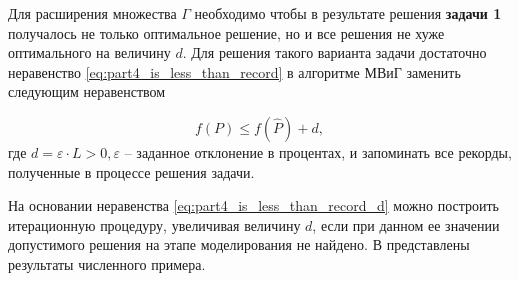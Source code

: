 Для расширения множества $\Gamma$ необходимо чтобы в результате решения \textbf{задачи 1} получалось не только оптимальное решение, но и все решения не хуже оптимального на величину $d$. Для решения такого варианта задачи достаточно неравенство \cref{eq:part4_is_less_than_record} в алгоритме МВиГ заменить следующим неравенством 

\begin{equation}
    \label{eq:part4_is_less_than_record_d}
    f(P) \leqslant f(\widehat{P}) + d,
\end{equation}
где $d = \varepsilon \cdot L > 0, \varepsilon$ -- заданное отклонение в процентах, и запоминать все рекорды, полученные в процессе решения задачи.

На основании неравенства \cref{eq:part4_is_less_than_record_d} можно построить итерационную процедуру, увеличивая величину $d$, если при данном ее значении допустимого решения на этапе моделирования не найдено.
В  представлены результаты численного примера.








